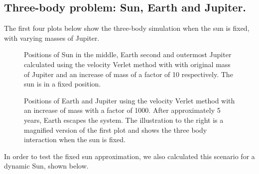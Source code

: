 \documentclass[../main.tex]{subfiles}
\begin{document}
\subsection{Three-body problem: Sun, Earth and Jupiter.}
The first four plots below show the three-body simulation when the sun is fixed, with varying masses of Jupiter.

\begin{figure}[!h]
  \centering
  \caption{Positions of Sun in the middle, Earth second and outermost Jupiter calculated using the velocity Verlet method with with original mass of Jupiter and an increase of mass of a factor of 10 respectively. The sun is in a fixed position.}
  \label{fig:SunEarthJupiter10fixed}
\end{figure}

\begin{figure}[!h]
  \centering
  \caption{Positions of Earth and Jupiter using the velocity Verlet method with an increase of mass with a factor of 1000. After approximately 5 years, Earth escapes the system. The illustration to the right is a magnified version of the first plot and shows the three body interaction when the sun is fixed.}
  \label{fig:SunEarthJupiter1000fixed}
\end{figure}
\FloatBarrier

In order to test the fixed sun approximation, we also calculated this scenario for a dynamic Sun, shown below.
\end{document}

